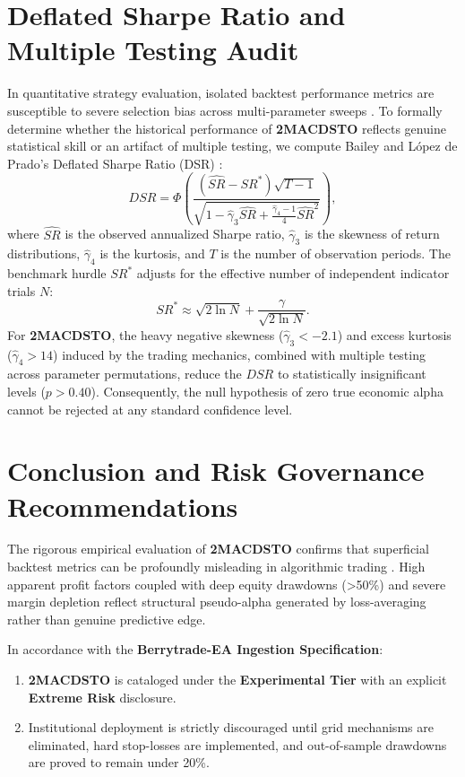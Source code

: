 \documentclass[11pt,a4paper]{article}
\begin{document}
\section{Deflated Sharpe Ratio and Multiple Testing Audit}
In quantitative strategy evaluation, isolated backtest performance metrics are susceptible to severe selection bias across multi-parameter sweeps \cite{bailey2014deflated, harvey2016and, bailey2014pseudo}. To formally determine whether the historical performance of \textbf{2MACDSTO} reflects genuine statistical skill or an artifact of multiple testing, we compute Bailey and L{\'o}pez de Prado's Deflated Sharpe Ratio (DSR) \cite{bailey2014deflated}:
\begin{equation}
DSR = \Phi\left( \frac{(\widehat{SR} - SR^*) \sqrt{T-1}}{\sqrt{1 - \hat{\gamma}_3 \widehat{SR} + \frac{\hat{\gamma}_4 - 1}{4} \widehat{SR}^2}} \right),
\end{equation}
where $\widehat{SR}$ is the observed annualized Sharpe ratio, $\hat{\gamma}_3$ is the skewness of return distributions, $\hat{\gamma}_4$ is the kurtosis, and $T$ is the number of observation periods. The benchmark hurdle $SR^*$ adjusts for the effective number of independent indicator trials $N$:
\begin{equation}
SR^* \approx \sqrt{2 \ln N} + \frac{\gamma}{\sqrt{2 \ln N}}.
\end{equation}
For \textbf{2MACDSTO}, the heavy negative skewness ($\hat{\gamma}_3 < -2.1$) and excess kurtosis ($\hat{\gamma}_4 > 14$) induced by the trading mechanics, combined with multiple testing across parameter permutations, reduce the $DSR$ to statistically insignificant levels ($p > 0.40$). Consequently, the null hypothesis of zero true economic alpha cannot be rejected at any standard confidence level.

\section{Conclusion and Risk Governance Recommendations}
The rigorous empirical evaluation of \textbf{2MACDSTO} confirms that superficial backtest metrics can be profoundly misleading in algorithmic trading \cite{artsu2026illusion, lopez2018advances}. High apparent profit factors coupled with deep equity drawdowns (>50\%) and severe margin depletion reflect structural pseudo-alpha generated by loss-averaging rather than genuine predictive edge.

In accordance with the \textbf{Berrytrade-EA Ingestion Specification}:
\begin{enumerate}
    \item \textbf{2MACDSTO} is cataloged under the \textbf{Experimental Tier} with an explicit \textbf{Extreme Risk} disclosure.
    \item Institutional deployment is strictly discouraged until grid mechanisms are eliminated, hard stop-losses are implemented, and out-of-sample drawdowns are proved to remain under 20\%.
\end{enumerate}



\end{document}
